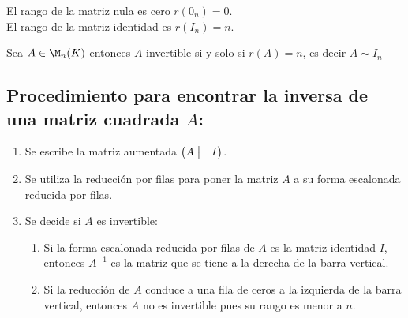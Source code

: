 \begin{rmk}
El rango de la matriz nula es cero $r(0_n) = 0$.\\
El rango de la matriz identidad es $r(I_n) = n$.
\end{rmk}

\begin{thm}
Sea $A\in  \M_n (K)$ entonces $A$ invertible si y solo si $r (A) = n$, es decir $A \sim I_n$
\end{thm}
\subsection{Procedimiento para encontrar la inversa de una matriz cuadrada $A$:}

\begin{enumerate}
\item
Se escribe la matriz aumentada $\begin{pmatrix}
A \bigm|& I
\end{pmatrix}$.

\item
Se utiliza la reducción por filas para poner la matriz $A$ a su forma escalonada reducida por filas.

\item
Se decide si $A$ es invertible:

\begin{enumerate}
\item
Si la forma escalonada reducida por filas de $A$ es la matriz identidad $I$, entonces $A^{-1}$ es la matriz que se tiene a la derecha de la barra vertical.

\item
Si la reducción de $A$ conduce a una fila de ceros a la izquierda de la barra vertical, entonces $A$ no es invertible pues su rango es menor a $n$.
\end{enumerate}
\end{enumerate} 

